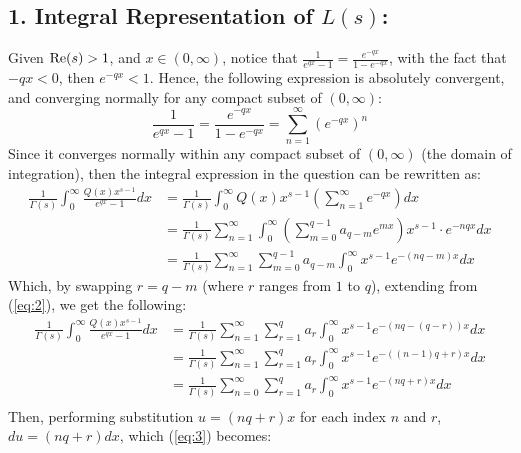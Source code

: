 \documentclass{article}
\begin{document}
\subsection*{1. Integral Representation of $L(s)$:}
Given $\textmd{Re}(s)>1$, and $x\in (0,\infty)$, notice that $\frac{1}{e^{qx}-1} = \frac{e^{-qx}}{1-e^{-qx}}$, with the fact that $-qx <0$, then $e^{-qx}<1$. Hence, the following expression is absolutely convergent, and converging normally for any compact subset of $(0,\infty)$:
\begin{equation}
    \label{eq:1}
    \frac{1}{e^{qx}-1}=\frac{e^{-qx}}{1-e^{-qx}} = \sum_{n=1}^{\infty}(e^{-qx})^n
\end{equation}
Since it converges normally within any compact subset of $(0,\infty)$ (the domain of integration), then the integral expression in the question can be rewritten as:
\begin{equation}
    \label{eq:2}
    \begin{split}
        \frac{1}{\Gamma(s)}\int_{0}^{\infty}\frac{Q(x)x^{s-1}}{e^{qx}-1}dx &= \frac{1}{\Gamma(s)}\int_{0}^{\infty}Q(x)x^{s-1}\left(\sum_{n=1}^{\infty}e^{-qx}\right)dx\\
        &= \frac{1}{\Gamma(s)}\sum_{n=1}^{\infty}\int_{0}^{\infty}\left(\sum_{m=0}^{q-1}a_{q-m}e^{mx}\right)x^{s-1}\cdot e^{-nqx}dx\\
        &= \frac{1}{\Gamma(s)}\sum_{n=1}^{\infty}\sum_{m=0}^{q-1}a_{q-m}\int_{0}^{\infty}x^{s-1}e^{-(nq-m)x}dx
    \end{split}
\end{equation}
Which, by swapping $r=q-m$ (where $r$ ranges from $1$ to $q$), extending from (\ref{eq:2}), we get the following:
\begin{equation}
    \label{eq:3}
    \begin{split}
        \frac{1}{\Gamma(s)}\int_{0}^{\infty}\frac{Q(x)x^{s-1}}{e^{qx}-1}dx &= \frac{1}{\Gamma(s)}\sum_{n=1}^{\infty}\sum_{r=1}^{q}a_r\int_{0}^{\infty}x^{s-1}e^{-(nq-(q-r))x}dx\\
        &= \frac{1}{\Gamma(s)}\sum_{n=1}^{\infty}\sum_{r=1}^{q}a_r\int_{0}^{\infty}x^{s-1}e^{-((n-1)q+r)x}dx\\
        &=\frac{1}{\Gamma(s)}\sum_{n=0}^{\infty}\sum_{r=1}^{q}a_r\int_{0}^{\infty}x^{s-1}e^{-(nq+r)x}dx\\
    \end{split}
\end{equation}
Then, performing substitution $u = (nq+r)x$ for each index $n$ and $r$, $du = (nq+r)dx$, which (\ref{eq:3}) becomes:
\end{document}
